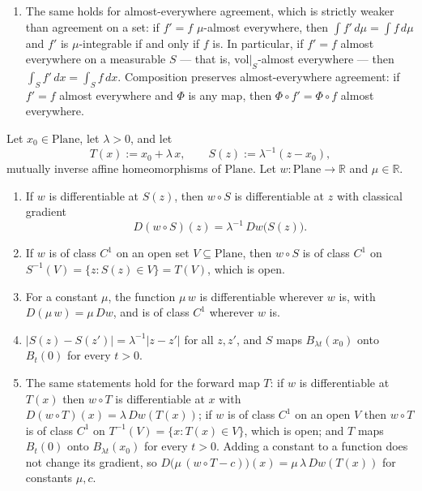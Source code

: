 \begin{proposition}
\begin{enumerate}
two functions agreeing on $S$ have the same integral over every subset of $S$ and the same
integrability there.
\item The same holds for almost-everywhere agreement, which is strictly weaker than agreement
on a set: if $f'=f$ $\mu$-almost everywhere, then $\int f'\,d\mu=\int f\,d\mu$ and $f'$ is
$\mu$-integrable if and only if $f$ is.  In particular, if $f'=f$ almost everywhere on a
measurable $S$ --- that is, $\mathrm{vol}|_{S}$-almost everywhere --- then
$\int_Sf'\,dx=\int_Sf\,dx$.  Composition preserves almost-everywhere agreement: if $f'=f$
almost everywhere and $\Phi$ is any map, then $\Phi\circ f'=\Phi\circ f$ almost everywhere.
\end{enumerate}
\end{proposition}

\begin{proposition}
Let $x_0\in\mathrm{Plane}$, let $\lambda>0$, and let
\[
  T(x):=x_0+\lambda\,x,\qquad S(z):=\lambda^{-1}(z-x_0),
\]
mutually inverse affine homeomorphisms of $\mathrm{Plane}$.  Let $w\colon\mathrm{Plane}\to\mathbb{R}$
and $\mu\in\mathbb{R}$.
\begin{enumerate}
\item If $w$ is differentiable at $S(z)$, then $w\circ S$ is differentiable at $z$ with
classical gradient
\[
  D(w\circ S)(z)=\lambda^{-1}\,Dw\bigl(S(z)\bigr).
\]
\item If $w$ is of class $C^{1}$ on an open set $V\subseteq\mathrm{Plane}$, then $w\circ S$ is of
class $C^{1}$ on $S^{-1}(V)=\{z:S(z)\in V\}=T(V)$, which is open.
\item For a constant $\mu$, the function $\mu\,w$ is differentiable wherever $w$ is, with
$D(\mu\,w)=\mu\,Dw$, and is of class $C^{1}$ wherever $w$ is.
\item $\lvert S(z)-S(z')\rvert=\lambda^{-1}\lvert z-z'\rvert$ for all $z,z'$, and
$S$ maps $B_{\lambda t}(x_0)$ onto $B_{t}(0)$ for every $t>0$.
\item The same statements hold for the forward map $T$: if $w$ is differentiable at $T(x)$ then
$w\circ T$ is differentiable at $x$ with $D(w\circ T)(x)=\lambda\,Dw(T(x))$; if $w$ is of class
$C^{1}$ on an open $V$ then $w\circ T$ is of class $C^{1}$ on
$T^{-1}(V)=\{x:T(x)\in V\}$, which is open; and $T$ maps $B_{t}(0)$ onto $B_{\lambda t}(x_0)$ for
every $t>0$.  Adding a constant to a function does not change its gradient, so
$D\bigl(\mu\,(w\circ T-c)\bigr)(x)=\mu\,\lambda\,Dw(T(x))$ for constants $\mu,c$.
\end{enumerate}
\end{proposition}

